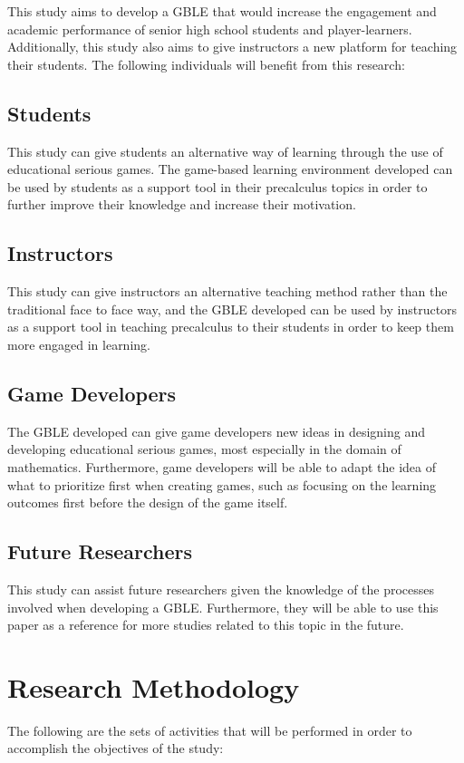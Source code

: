 This study aims to develop a GBLE that would increase the engagement and academic performance of senior high school students and player-learners. Additionally, this study also aims to give instructors a new platform for teaching their students. The following individuals will benefit from this research: 

\begin{subs}
\subsection{Students}
This study can give students an alternative way of learning through the use of educational serious games. The game-based learning environment developed can be used by students as a support tool in their precalculus topics in order to further improve their knowledge and increase their motivation.

\subsection{Instructors}
This study can give instructors an alternative teaching method rather than the traditional face to face way, and the GBLE developed can be used by instructors as a support tool in teaching precalculus to their students in order to keep them more engaged in learning.

\subsection{Game Developers}
The GBLE developed can give game developers new ideas in designing and developing educational serious games, most especially in the domain of mathematics. Furthermore, game developers will be able to adapt the idea of what to prioritize first when creating games, such as focusing on the learning outcomes first before the design of the game itself.

\subsection{Future Researchers}
This study can assist future researchers given the knowledge of the processes involved when developing a GBLE. Furthermore, they will be able to use this paper as a reference for more studies related to this topic in the future.
\end{subs}

\section{Research Methodology}
The following are the sets of activities that will be performed in order to accomplish the objectives of the study:


